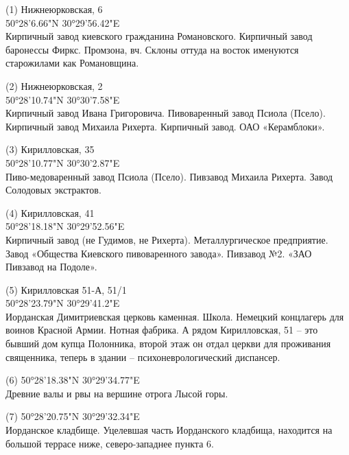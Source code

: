 \begin{flushleft}
(1) Нижнеюрковская, 6\\
 50°28'6.66"N 30°29'56.42"E\\
Кирпичный завод киевского гражданина Романовского. Кирпичный завод баронессы Фиркс. Промзона, вч. Склоны оттуда на восток именуются старожилами как Романовщина.

\medskip

(2) Нижнеюрковская, 2\\
50°28'10.74"N 30°30'7.58"E\\ Кирпичный завод Ивана Григоровича. Пивоваренный завод Псиола (Псело). Кирпичный завод Михаила Рихерта. Кирпичный завод. ОАО «Керамблоки».

\medskip

(3) Кирилловская, 35\\
50°28'10.77"N 30°30'2.87"E\\ Пиво-медоваренный завод Псиола (Псело). Пивзавод Михаила Рихерта. Завод Солодовых экстрактов.

\medskip

(4) Кирилловская, 41\\
50°28'18.18"N 30°29'52.56"E\\ Кирпичный завод (не Гудимов, не Рихерта). Металлургическое предприятие. Завод «Общества Киевского пивоваренного завода». Пивзавод №2. «ЗАО Пивзавод на Подоле».

\medskip
 
(5) Кирилловская 51-А, 51/1\\
50°28'23.79"N 30°29'41.2"E\\ Иорданская Димитриевская церковь каменная. Школа. Немецкий концлагерь для воинов Красной Армии. Нотная фабрика. А рядом Кирилловская, 51 – это бывший дом купца Полонника, второй этаж он отдал церкви для проживания священника, теперь в здании – психоневрологический диспансер.\\

\medskip

(6) 50°28'18.38"N 30°29'34.77"E\\
Древние валы и рвы на вершине отрога Лысой горы.\\

\medskip

(7) 50°28'20.75"N 30°29'32.34"E\\
Иорданское кладбище. Уцелевшая часть Иорданского кладбища, находится на большой террасе ниже, северо-западнее пункта 6.\\

\medskip


\end{flushleft}
